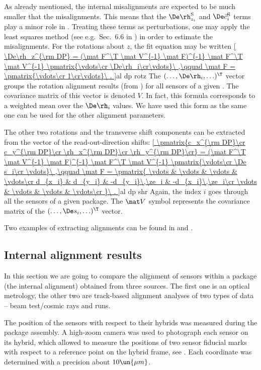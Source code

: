 As already mentioned, the internal misalignments are expected to be much smaller that the  misalignments. This means that the $\De\rh_{z_i}^{\rm S}$ and $ \De\vec c_i^{\rm S}$ terms play a minor role in . Treating these terms as perturbations, one may apply the least squares method (see e.g.~Sec.~6.6 in ) in order to estimate the  misalignments. For the rotations about $z$, the fit equation may be written
\eqref{
	\De\rh_z^{\rm DP} = (\mat F^\T \mat V^{-1} \mat F)^{-1} \mat F^\T \mat V^{-1} \pmatrix{\vdots\cr \De\rh_i\cr\vdots}\ ,\qquad
	\mat F = \pmatrix{\vdots\cr 1\cr\vdots}\ .
}{al dp rotz}
The $(\ldots, \De\rh_i, \ldots)^\T$ vector groups the rotation alignment results (from ) for all sensors of a given . The covariance matrix of this vector is denoted $V$. In fact, this formula corresponds to a weighted mean over the $\De\rh_i$ values. We have used this form as the same one can be used for the other  alignment parameters.

The other two  rotations and the transverse  shift components can be extracted from the vector of the read-out-direction shifts:
\eqref{
	\pmatrix{c_x^{\rm DP}\cr c_y^{\rm DP}\cr \rh_x^{\rm DP}\cr \rh_y^{\rm DP}\cr} =
	(\mat F^\T \mat V^{-1} \mat F)^{-1} \mat F^\T \mat V^{-1}
	\pmatrix{\vdots\cr \De s_i\cr \vdots}\ ,\qquad
	\mat F = \pmatrix{
		\vdots & \vdots & \vdots & \vdots\cr
		d_{x_i} & d_{y_i} & -d_{y_i}\,\ze_i & -d_{x_i}\,\ze_i\cr
		\vdots & \vdots & \vdots & \vdots\cr
	}\ .
}{al dp shr}
Again, the index $i$ goes through all the sensors of a given package. The $\mat V$ symbol represents the covariance matrix of the $(\ldots, \De s _i, \ldots)^\T$ vector.

Two examples of extracting  alignments can be found in  and .


\subsection[al int res]{Internal alignment results}

In this section we are going to compare the alignment of sensors within a package (the internal alignment) obtained from three sources. The first one is an optical metrology, the other two are track-based alignment analyses of two types of data -- beam test/cosmic rays and  runs.


The position of the sensors with respect to their hybrids was measured during the package assembly. A high-zoom camera was used to photograph each sensor on its hybrid, which allowed to measure the positions of two sensor fiducial marks with respect to a reference point on the hybrid frame, see . Each coordinate was determined with a precision about $10\un{\mu m}$.

